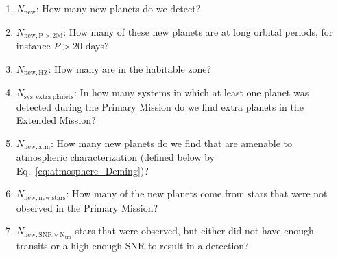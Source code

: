 \begin{enumerate}
	\item $N_\mathrm{new}$: How many new planets do we detect?
	\item $N_\mathrm{new,P>20d}$: How many of these new planets are at long orbital periods, for instance $P>20$ days?
	\item $N_\mathrm{new,HZ}$: How many are in the habitable zone?
	\item $N_\mathrm{sys,extra\ planets}$: In how many systems in which at least one planet was detected during the Primary Mission do we find extra planets in the Extended Mission?
	\item $N_\mathrm{new,atm}$: How many new planets do we find that are amenable to atmospheric characterization (defined below by Eq.~\ref{eq:atmosphere_Deming})?
	\item $N_\mathrm{new,new\ stars}$: How many of the new planets come from 
	stars that were not observed in the Primary Mission? 
	\item $N_\mathrm{new,SNR\lor N_{tra}}$ stars that were observed, but either did not have enough transits or a high enough SNR to result in a detection?
\end{enumerate}
